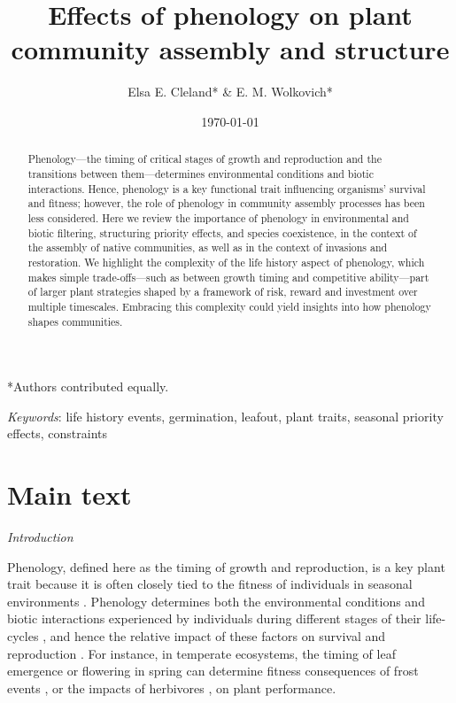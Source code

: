 \documentclass[11pt]{article}
\begin{document}
\renewcommand{\refname}{\CHead{}}

\title{Effects of phenology on plant community assembly and structure }
\author{Elsa E. Cleland* \& E. M. Wolkovich*}
\date{\today}
\maketitle


\setlength{\parindent}{0cm}
\setlength{\parskip}{5pt}
*Authors contributed equally.

\begin{abstract} %
Phenology---the timing of critical stages of growth and reproduction and the transitions between them---determines environmental conditions and biotic interactions. Hence, phenology is a key functional trait influencing organisms' survival and fitness; however, the role of phenology in community assembly processes has been less considered. Here we review the importance of phenology in environmental and biotic filtering, structuring priority effects, and species coexistence, in the context of the assembly of native communities, as well as in the context of invasions and restoration. We highlight the complexity of the life history aspect of phenology, which makes simple trade-offs---such as between growth timing and competitive ability---part of larger plant strategies shaped by a framework of risk, reward and investment over multiple timescales. Embracing this complexity could yield insights into how phenology shapes communities.
\end{abstract}

\emph{Keywords}: life history events, germination, leafout, plant traits, seasonal priority effects, constraints

\section{Main text}

\emph{Introduction} 

Phenology, defined here as the timing of growth and reproduction, is a key plant trait because it is often closely tied to the fitness of individuals in seasonal environments \citep{verdu2005early,munguia2011meta}. Phenology determines both the environmental conditions and biotic interactions experienced by individuals during different stages of their life-cycles \citep{donohue2005niche}, and hence the relative impact of these factors on survival and reproduction \citep{caruso2019meta}. For instance, in temperate ecosystems, the timing of leaf emergence or flowering in spring can determine fitness consequences of frost events \citep{inouye2008effects,augspurger2013reconstructing}, or the impacts of herbivores \citep{meineke2021phenological}, on plant performance.
\end{document}

